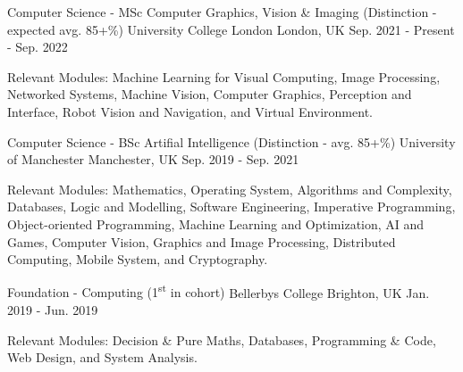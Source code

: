 

\begin{cventries}

  \cventry
    {Computer Science - MSc Computer Graphics, Vision \& Imaging (Distinction - expected avg. 85+\%)} %
    {University College London} %
    {London, UK} %
    {Sep. 2021 - Present - Sep. 2022} %
    {
      \begin{cvitems} %
        \item {Relevant Modules: Machine Learning for Visual Computing, Image Processing, Networked Systems, Machine Vision, Computer Graphics, Perception and Interface, Robot Vision and Navigation, and Virtual Environment.}
      \end{cvitems}
    }
    
  \cventry
    {Computer Science - BSc Artifial Intelligence (Distinction - avg. 85+\%)} %
    {University of Manchester} %
    {Manchester, UK} %
    {Sep. 2019 - Sep. 2021} %
    {
      \begin{cvitems} %
        \item {Relevant Modules: Mathematics, Operating System, Algorithms and Complexity, Databases, Logic and Modelling, Software Engineering, Imperative Programming, Object-oriented Programming, Machine Learning and Optimization, AI and Games,  Computer Vision, Graphics and Image Processing, Distributed Computing, Mobile System, and Cryptography.}
      \end{cvitems}
    }
    
    \cventry
    {Foundation - Computing (1\textsuperscript{st} in cohort)} %
    {Bellerbys College} %
    {Brighton, UK} %
    {Jan. 2019 - Jun. 2019} %
    {
     \begin{cvitems} %
        \item {Relevant Modules: Decision \& Pure Maths, Databases, Programming \& Code, Web Design, and System Analysis.}
      \end{cvitems}
    }
    

\end{cventries}
